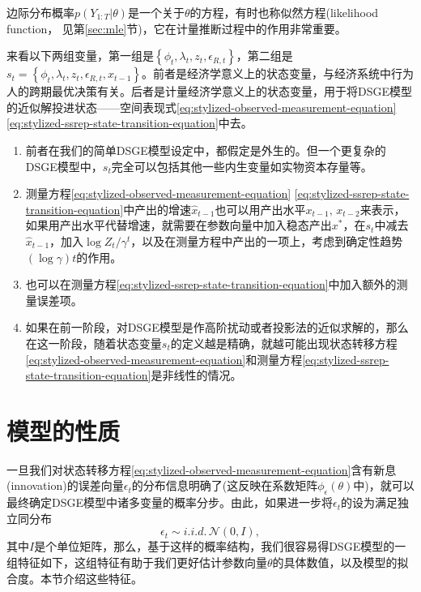 边际分布概率$p \left( Y_{1:T} | \theta \right)$是一个关于$\theta$的方程，有时也称似然方程(likelihood function， 见第\ref{sec:mle}节)，它在计量推断过程中的作用非常重要。

\begin{remark}[``状态"变量]
  来看以下两组变量，第一组是$\left\{ \phi_{t}, \lambda_{t}, z_{t}, \epsilon_{R,t} \right\}$，第二组是$s_{t} = \left\{ \phi_{t}, \lambda_{t}, z_{t}, \epsilon_{R,t}, \hat{x}_{t-1} \right\}$。前者是经济学意义上的状态变量，与经济系统中行为人的跨期最优决策有关。后者是计量经济学意义上的状态变量，用于将DSGE模型的近似解投进状态——空间表现式\eqref{eq:stylized-observed-measurement-equation} \eqref{eq:stylized-ssrep-state-transition-equation}中去。

  \begin{enumerate}
    \item 前者在我们的简单DSGE模型设定中，都假定是外生的。但一个更复杂的DSGE模型中，$s_{t}$完全可以包括其他一些内生变量如实物资本存量等。
    \item 测量方程\eqref{eq:stylized-observed-measurement-equation} \eqref{eq:stylized-ssrep-state-transition-equation}中产出的增速$\hat{x}_{t-1}$也可以用产出水平$x_{t-1}, \, x_{t-2}$来表示，如果用产出水平代替增速，就需要在参数向量中加入稳态产出$x^{*}$，在$s_{t}$中减去$\hat{x}_{t-1}$，加入$\log Z_{t}/\gamma^{t}$，以及在测量方程中产出的一项上，考虑到确定性趋势$\left( \log \gamma \right) t$的作用。
    \item 也可以在测量方程\eqref{eq:stylized-ssrep-state-transition-equation}中加入额外的测量误差项。
    \item 如果在前一阶段，对DSGE模型是作高阶扰动或者投影法的近似求解的，那么在这一阶段，随着状态变量$s_{t}$的定义越是精确，就越可能出现状态转移方程\eqref{eq:stylized-observed-measurement-equation}和测量方程\eqref{eq:stylized-ssrep-state-transition-equation}是非线性的情况。
  \end{enumerate}
\end{remark}

\section{模型的性质}
\label{sec:stylized-model-implications}
一旦我们对状态转移方程\eqref{eq:stylized-observed-measurement-equation}含有新息(innovation)的误差向量$\epsilon_{t}$的分布信息明确了(这反映在系数矩阵$\phi_{\epsilon} \left( \theta \right)$中)，就可以最终确定DSGE模型中诸多变量的概率分步。由此，如果进一步将$\epsilon_{t}$的设为满足独立同分布
\begin{equation*}
  \epsilon_{t} \sim i.i.d. \, \mathcal{N} \left(0, I \right),
\end{equation*}
其中$I$是个单位矩阵，那么，基于这样的概率结构，我们很容易得DSGE模型的一组特征如下，这组特征有助于我们更好估计参数向量$\theta$的具体数值，以及模型的拟合度。本节介绍这些特征。

